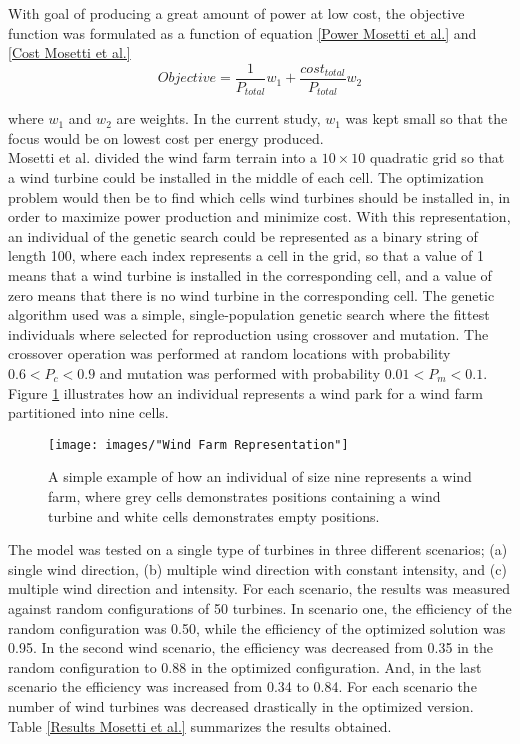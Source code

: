 \noindent With goal of producing a great amount of power at low cost, the objective function was formulated as a function of equation \ref{Power Mosetti et al.} and \ref{Cost Mosetti et al.}\\


\begin{equation}
Objective = \frac{1}{P_{total}}w_1 + \frac{cost_{total}}{P_{total}}w_2
\label{Objective function Mosetti et al.}
\end{equation}


\noindent where $w_1$ and $w_2$ are weights. In the current study, $w_1$ was kept small so that the focus would be on lowest cost per energy produced. \\

\noindent Mosetti et al. divided the wind farm terrain into a $10\times10$ quadratic grid so that a wind turbine could be installed in the middle of each cell. The optimization problem would then be to find which cells wind turbines should be installed in, in order to maximize power production and minimize cost. With this representation, an individual of the genetic search could be represented as a binary string of length 100, where each index represents a cell in the grid, so that a value of 1 means that a wind turbine is installed in the corresponding cell, and a value of zero means that there is no wind turbine in the corresponding cell. The genetic algorithm used was a simple, single-population genetic search where the fittest individuals where selected for reproduction using crossover and mutation. The crossover operation was performed at random locations with probability $0.6 < P_c < 0.9$ and mutation was performed with probability $0.01 < P_m < 0.1$. Figure \ref{Wind Farm Representation} illustrates how an individual represents a wind park for a wind farm partitioned into nine cells.\\


\begin{figure}[h!]
\begin{center}
\texttt{[image: images/"Wind Farm Representation"]}
\caption{A simple example of how an individual of size nine represents a wind farm, where grey cells demonstrates positions containing a wind turbine and white cells demonstrates empty positions. }
\label{Wind Farm Representation}
\end{center}
\end{figure}


\noindent The model was tested on a single type of turbines in three different scenarios; (a) single wind direction, (b) multiple wind direction with constant intensity, and (c) multiple wind direction and intensity. For each scenario, the results was measured against random configurations of 50 turbines. In scenario one, the efficiency of the random configuration was 0.50, while the efficiency of the optimized solution was 0.95. In the second wind scenario, the efficiency was decreased from 0.35 in the random configuration to 0.88 in the optimized configuration. And, in the last scenario the efficiency was increased from 0.34 to 0.84. For each scenario the number of wind turbines was decreased drastically in the optimized version. Table \ref{Results Mosetti et al.} summarizes the results obtained.

